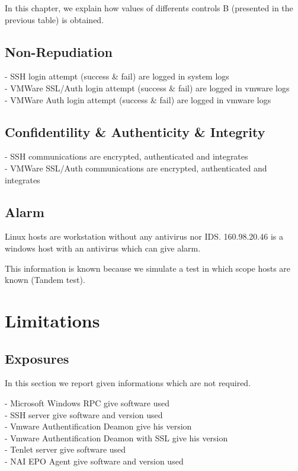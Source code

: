 \documentclass[10pt,a4paper,twoside,onecolumn]{article}
\begin{document}
In this chapter, we explain how values of differents controls B (presented in the previous table) is obtained.

\subsection{Non-Repudiation}

- SSH login attempt (success \& fail) are logged in system logs\\
- VMWare SSL/Auth login attempt (success \& fail) are logged in vmware logs\\
- VMWare Auth login attempt (success \& fail) are logged in vmware logs

\subsection{Confidentility \& Authenticity \& Integrity}

- SSH communications are encrypted, authenticated and integrates\\
- VMWare SSL/Auth communications are encrypted, authenticated and integrates

\subsection{Alarm}

Linux hosts are workstation without any antivirus nor IDS. 160.98.20.46 is a windows host with an antivirus which can give alarm.

This information is known because we simulate a test in which scope hosts are known (Tandem test).


\section{Limitations}

\subsection{Exposures}

In this section we report given informations which are not required.

- Microsoft Windows RPC give software used\\
- SSH server give software and version used\\
- Vmware Authentification Deamon give his version\\
- Vmware Authentification Deamon with SSL give his version\\
- Tenlet server give software used\\
- NAI EPO Agent give software and version used
\end{document}
